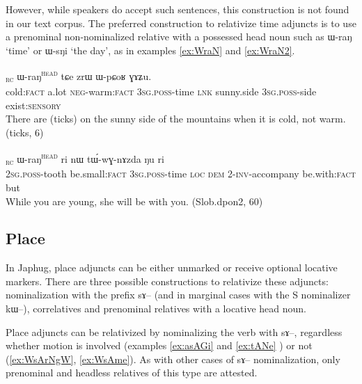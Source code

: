 \documentclass[oldfontcommands,oneside,a4paper,11pt]{article}
\newcommand{\ipa}[1]{{\phon #1}} %
\newcommand{\topic}{\textsc{dem}}
\newcommand{\tete}{\textsuperscript{\textsc{head}}}
\newcommand{\rc}{\textsubscript{\textsc{rc}}}
\begin{document}
However, while speakers do accept such sentences, this construction is not found in our text corpus. The preferred construction to relativize time adjuncts is to use a prenominal non-nominalized relative with a possessed head noun such as \ipa{ɯ-raŋ} `time' or \ipa{ɯ-sŋi} `the day', as in examples \ref{ex:WraN} and \ref{ex:WraN2}.

\begin{exe}
   \ex \label{ex:WraN}
 \gll  [\ipa{mɯɕtaʁ}   	\ipa{kʰro}   	\ipa{mɤ-mpja}]\rc{}   	\ipa{ɯ-raŋ}\tete{}   	\ipa{tɕe}   	\ipa{zrɯ}   	\ipa{ɯ-pɕoʁ}   	\ipa{ɣɤʑu.}    \\
 cold:\textsc{fact} a.lot \textsc{neg-}warm:\textsc{fact}  \textsc{3sg.poss}-time \textsc{lnk} sunny.side \textsc{3sg.poss}-side exist:\textsc{sensory}  \\
\glt There are (ticks) on the sunny side of the mountains when it is cold, not warm. (ticks, 6)
\end{exe}

\begin{exe}
   \ex \label{ex:WraN2}
 \gll [\ipa{nɤ-ɕɣa}   	\ipa{xtɕi}]\rc{}   	\ipa{ɯ-raŋ}\tete{}   	\ipa{ri}   	\ipa{nɯ}   	\ipa{tɯ́-wɣ-nɤzda}   	\ipa{ŋu}   	\ipa{ri}   \\
 \textsc{2sg.poss}-tooth be.small:\textsc{fact} \textsc{3sg.poss}-time \textsc{loc} \topic{} 2-\textsc{inv}-accompany be.with:\textsc{fact} but \\
\glt While you are young, she will be with you. (Slob.dpon2, 60)
\end{exe}

 



\subsection{Place} \label{sec:rel:place}
In Japhug, place adjuncts can be either unmarked or receive optional locative markers. %
There are three possible constructions to relativize these adjuncts: nominalization with the prefix \ipa{sɤ}-- (and in marginal cases with the S nominalizer \ipa{kɯ--}), correlatives and prenominal relatives with a locative head noun.

Place adjuncts can be relativized by nominalizing the verb with \ipa{sɤ}--, regardless whether motion is involved (examples \ref{ex:asAGi} and \ref{ex:tANe} )  or not (\ref{ex:WsArNgW}, \ref{ex:WsAme}). As with other cases of \ipa{sɤ}-- nominalization, only prenominal and headless relatives of this type are attested.
\end{document}

